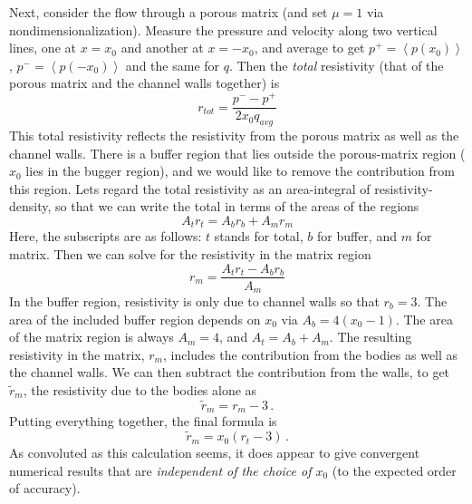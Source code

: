\documentclass[11pt]{article}
\begin{document}
Next, consider the flow through a porous matrix (and set $\mu=1$ via nondimensionalization). Measure the pressure and velocity along two vertical lines, one at $x = x_0$ and another at $x = -x_0$, and average to get $p^+ = \left< p(x_0) \right>$, $p^- = \left<p(-x_0) \right>$ and the same for $q$. Then the {\em total} resistivity (that of the porous matrix and the channel walls together) is 
\begin{equation}
r_{tot} = \frac{p^- - p^+}{2 x_0 q_{avg}}
\end{equation}
This total resistivity reflects the resistivity from the porous matrix as well as the channel walls. There is a buffer region that lies outside the porous-matrix region ($x_0$ lies in the bugger region), and we would like to remove the contribution from this region. Lets regard the total resistivity as an area-integral of resistivity-density, so that we can write the total in terms of the areas of the regions
\begin{equation}
A_{t} r_{t} = A_{b} r_{b} + A_{m} r_{m}
\end{equation}
Here, the subscripts are as follows: $t$ stands for total, $b$ for buffer, and $m$ for matrix. Then we can solve for the resistivity in the matrix region
\begin{equation}
r_m = \frac{A_t r_t - A_b r_b}{A_m}
\end{equation}
In the buffer region, resistivity is only due to channel walls so that $r_b = 3$. The area of the included buffer region depends on $x_0$ via $A_b = 4(x_0 - 1)$. The area of the matrix region is always $A_m = 4$, and $A_t = A_b + A_m$. The resulting resistivity in the matrix, $r_m$, includes the contribution from the bodies as well as the channel walls. We can then subtract the contribution from the walls, to get $\tilde{r}_m$, the resistivity due to the bodies alone as
\begin{equation}
\tilde{r}_m = r_m - 3 \, .
\end{equation}
Putting everything together, the final formula is
\begin{equation}
\tilde{r}_m = x_0 (r_t - 3) \, .
\end{equation}
As convoluted as this calculation seems, it does appear to give convergent numerical results that are {\em independent of the choice of $x_0$} (to the expected order of accuracy).
\end{document}
